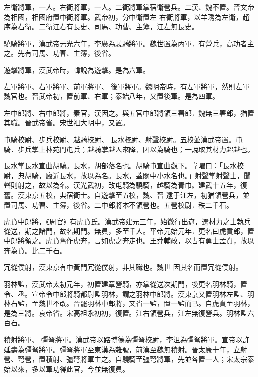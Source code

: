 \begin{pinyinscope}
 左衛將軍，一人。右衛將軍，一人。二衛將軍掌宿衛營兵。二漢、魏不置。晉文帝為相國，相國府置中衛將軍。武帝初，分中衛置左
 右衛將軍，以羊琇為左衛，趙序為右衛。二衛江右有長史、司馬、功曹、主簿，江左無長史。



 驍騎將軍，漢武帝元光六年，李廣為驍騎將軍。魏世置為內軍，有營兵，高功者主之。先有司馬、功曹、主簿，後省。



 遊擊將軍，漢武帝時，韓說為遊擊。是為六軍。



 左軍將軍、右軍將軍、前軍將軍、
 後軍將軍。魏明帝時，有左軍將軍，然則左軍魏官也。晉武帝初，置前軍、右軍；泰始八年，又置後軍。是為四軍。



 左中郎將、右中郎將，秦官，漢因之。與五官中郎將領三署郎，魏無三署郎，猶置其職。晉武帝省。宋世祖大明中，又置。



 屯騎校尉、步兵校尉、越騎校尉、
 長水校尉、射聲校尉。五校並漢武帝置。屯騎、步兵掌上林苑門屯兵；越騎掌越人來降，因以為騎也；一說取其材力超越也。



 長水掌長水宣曲胡騎。長水，胡部落名也。胡騎屯宣曲觀下。韋曜曰：「長水校尉，典胡騎，廄近長水，故以為名。長水，蓋關中小水名也。」射聲掌射聲士，聞聲則射之，故以為名。漢光武初，改屯騎為驍騎，越騎為青巾。建武十五年，復舊。漢東京五校，典宿衛士。自遊擊至五校，魏、晉
 逮于江左，初猶領營兵，並置司馬、功曹、主簿，後省。二中郎將本不領營也。五營校尉，秩二千石。



 虎賁中郎將，《周官》有虎賁氏。漢武帝建元三年，始微行出遊，選材力之士執兵從送，期之諸門，故名期門。無員，多至千人。平帝元始元年，更名曰虎賁郎，置中郎將領之。虎賁舊作虎奔，言如虎之奔走也。王莽輔政，以古有勇士孟賁，故以奔為賁。比二千石。



 冗從僕射，漢東京有中黃門冗從僕射，非其職也。魏世
 因其名而置冗從僕射。



 羽林監，漢武帝太初元年，初置建章營騎，亦掌從送次期門，後更名羽林騎，置令、丞。宣帝令中郎將騎都尉監羽林，謂之羽林中郎將。漢東京又置羽林左監、羽林右監，至魏世不改。晉罷羽林中郎將，又省一監，置一監而已。自虎賁至羽林，是為三將。哀帝省。宋高祖永初初，復置。江右領營兵，江左無復營兵。羽林監六百石。



 積射將軍、
 彊弩將軍。漢武帝以路博德為彊弩校尉，李沮為彊弩將軍。宣帝以許延壽為彊弩將軍。彊弩將軍至東漢為雜號，前漢至魏無積射。晉太康十年，立射營、弩營，置積射、彊弩將軍主之。自驍騎至彊弩將軍，先並各置一人；宋太宗泰始以來，多以軍功得此官，今並無復員。




\end{pinyinscope}
